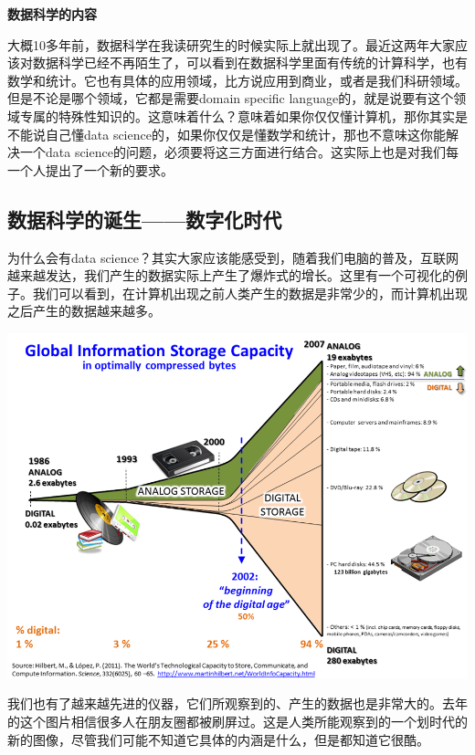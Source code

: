 \documentclass[
  oneside]{book}
\begin{document}
\textbf{数据科学的内容}

大概10多年前，数据科学在我读研究生的时候实际上就出现了。最近这两年大家应该对数据科学已经不再陌生了，可以看到在数据科学里面有传统的计算科学，也有数学和统计。它也有具体的应用领域，比方说应用到商业，或者是我们科研领域。但是不论是哪个领域，它都是需要domain specific language的，就是说要有这个领域专属的特殊性知识的。这意味着什么？意味着如果你仅仅懂计算机，那你其实是不能说自己懂data science的，如果你仅仅是懂数学和统计，那也不意味这你能解决一个data science的问题，必须要将这三方面进行结合。这实际上也是对我们每一个人提出了一个新的要求。

\hypertarget{1-data-science-born}{%
\subsection{数据科学的诞生------数字化时代}\label{1-data-science-born}}

为什么会有data
science？其实大家应该能感受到，随着我们电脑的普及，互联网越来越发达，我们产生的数据实际上产生了爆炸式的增长。这里有一个可视化的例子。我们可以看到，在计算机出现之前人类产生的数据是非常少的，而计算机出现之后产生的数据越来越多。

\includegraphics{1001-lesson1/image-20230302194802453.png}

我们也有了越来越先进的仪器，它们所观察到的、产生的数据也是非常大的。去年的这个图片相信很多人在朋友圈都被刷屏过。这是人类所能观察到的一个划时代的新的图像，尽管我们可能不知道它具体的内涵是什么，但是都知道它很酷。
\end{document}
